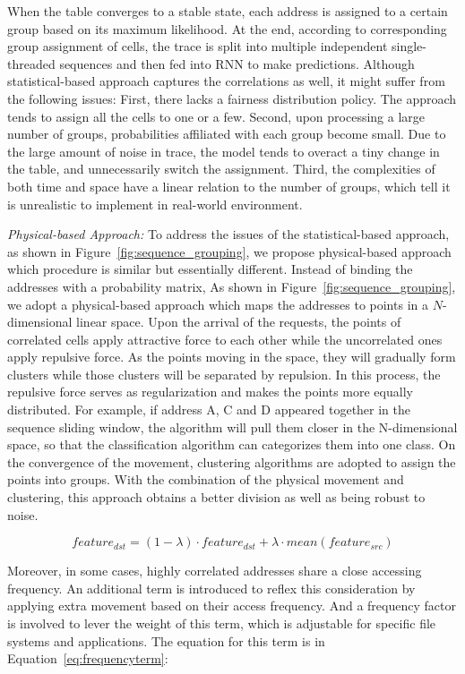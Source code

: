 When the table converges to a stable state, each address is assigned to a certain group based on its maximum likelihood.
At the end, according to corresponding group assignment of cells,
the trace is split into multiple independent single-threaded sequences
and then fed into RNN to make predictions.
Although statistical-based approach captures the correlations as well,
it might suffer from the following issues:
First, there lacks a fairness distribution policy.
The approach tends to assign all the cells to one or a few.
Second, upon processing a large number of groups,
probabilities affiliated with each group become small.
Due to the large amount of noise in trace,
the model tends to overact a tiny change in the table,
and unnecessarily switch the assignment.
Third, the complexities of both time and space have a linear relation
to the number of groups, which tell it is unrealistic to implement
in real-world environment.

\emph{Physical-based Approach:}
To address the issues of the statistical-based approach, as shown in Figure~\ref{fig:sequence_grouping},
we propose physical-based approach which procedure is similar but essentially different.
Instead of binding the addresses with a probability matrix,
\fi
As shown in Figure~\ref{fig:sequence_grouping}, we adopt a physical-based approach which
maps the addresses to points in a $N$-dimensional linear space.
Upon the arrival of the requests, the points of correlated cells apply attractive force to each other while the uncorrelated ones apply repulsive force.
As the points moving in the space, they will gradually form clusters while those clusters will be separated by repulsion.
In this process, the repulsive force serves as regularization and makes the points more equally distributed.
For example, if address A, C and D appeared together in the sequence sliding window,
the algorithm will pull them closer in the N-dimensional space,
so that the classification algorithm can categorizes them into one class.
On the convergence of the movement, clustering algorithms are adopted to assign the points into groups.
With the combination of the physical movement and clustering, this approach obtains a better division as well as being robust to noise.

\begin{equation}
\label{eq:physicalbasedequation}
feature_{dst} = (1 - \lambda) \cdot feature_{dst} + \lambda \cdot mean(feature_{src})
\end{equation}

Moreover, in some cases, highly correlated addresses share a close accessing frequency.
An additional term is introduced to reflex this consideration by applying extra movement based on their access frequency.
And a frequency factor is involved to lever the weight of this term, which is adjustable for specific file systems and applications.
The equation for this term is in Equation~\ref{eq:frequencyterm}:

